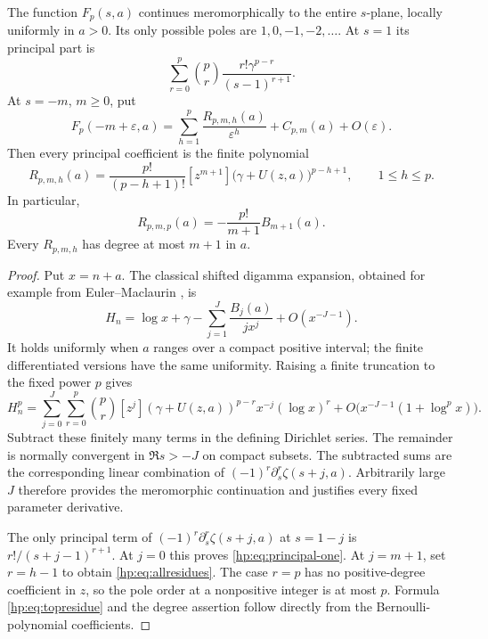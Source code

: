 \begin{theorem}\label{hp:thm:poles}
The function $F_p(s,a)$ continues meromorphically to the entire $s$-plane,
locally uniformly in $a>0$. Its only possible poles are
$1,0,-1,-2,\ldots$. At $s=1$ its principal part is
\begin{equation}\label{hp:eq:principal-one}
 \sum_{r=0}^p\binom pr\frac{r!\gamma^{p-r}}{(s-1)^{r+1}}.
\end{equation}
At $s=-m$, $m\ge0$, put
\[
 F_p(-m+\varepsilon,a)
 =\sum_{h=1}^p\frac{R_{p,m,h}(a)}{\varepsilon^h}
       +C_{p,m}(a)+O(\varepsilon).
\]
Then every principal coefficient is the finite polynomial
\begin{equation}\label{hp:eq:allresidues}
 \boxed{\quad
 R_{p,m,h}(a)=\frac{p!}{(p-h+1)!}
       [z^{m+1}]\bigl(\gamma+U(z,a)\bigr)^{p-h+1},
 \qquad 1\le h\le p.\quad}
\end{equation}
In particular,
\begin{equation}\label{hp:eq:topresidue}
 R_{p,m,p}(a)=-\frac{p!}{m+1}B_{m+1}(a).
\end{equation}
Every $R_{p,m,h}$ has degree at most $m+1$ in $a$.
\end{theorem}

\begin{proof}
Put $x=n+a$. The classical shifted digamma expansion, obtained for
example from Euler--Maclaurin \cite{hp:DLMF}, is
\begin{equation}\label{hp:eq:digamma-expansion}
 H_n=\log x+\gamma-
       \sum_{j=1}^{J}\frac{B_j(a)}{jx^j}+O(x^{-J-1}).
\end{equation}
It holds uniformly when $a$ ranges over a compact positive interval;
the finite differentiated versions have the same uniformity. Raising a
finite truncation to the fixed power $p$ gives
\[
 H_n^p=\sum_{j=0}^{J}\sum_{r=0}^p
  \binom pr[z^j](\gamma+U(z,a))^{p-r}
                    x^{-j}(\log x)^r
       +O\bigl(x^{-J-1}(1+\log^p x)\bigr).
\]
Subtract these finitely many terms in the defining Dirichlet series.
The remainder is normally convergent in $\Re s>-J$ on compact
subsets. The subtracted sums are the corresponding linear combination
of $(-1)^r\partial_s^r\zeta(s+j,a)$. Arbitrarily large $J$ therefore
provides the meromorphic continuation and justifies every fixed
parameter derivative.

The only principal term of
$(-1)^r\partial_s^r\zeta(s+j,a)$ at $s=1-j$ is
$r!/(s+j-1)^{r+1}$. At $j=0$ this proves
\eqref{hp:eq:principal-one}. At $j=m+1$, set $r=h-1$ to obtain
\eqref{hp:eq:allresidues}. The case $r=p$ has no positive-degree
coefficient in $z$, so the pole order at a nonpositive integer is at
most $p$. Formula \eqref{hp:eq:topresidue} and the degree assertion
follow directly from the Bernoulli-polynomial coefficients.
\end{proof}

